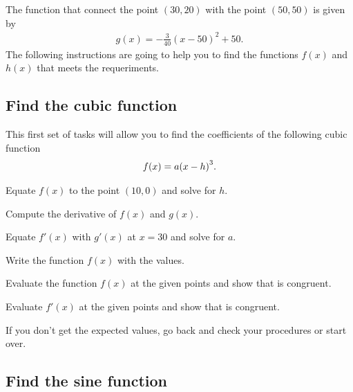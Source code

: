 \documentclass[11pt, a4paper, oneside]{article}
\begin{document}
    The function that connect the point \((30,20)\) with the point \((50,50)\) is given by
    \begin{gather*}
        g(x) = -\frac{3}{40}(x-50)^2 + 50.
    \end{gather*}
    The following instructions are going to help you to find the functions $f(x)$ and $h(x)$ that meets the requeriments.

    \subsection*{Find the cubic function}

    This first set of tasks will allow you to find the coefficients of the following cubic function
    \begin{gather*}
        f(x) = a\qty(x-h)^3.
    \end{gather*}

    Equate \(f(x)\) to the point \((10,0)\) and solve for \(h\).

    \boxarea[2cm]

    Compute the derivative of \(f(x)\) and \(g(x)\).
    
    \boxarea[2cm]

    Equate \(f'(x)\) with \(g'(x)\) at $x=30$ and solve for $a$.
    
    \boxarea[2cm]

    Write the function \(f(x)\) with the values.    
    
    \boxarea[2cm]

    Evaluate the function \(f(x)\) at the given points and show that is congruent.
    
    \boxarea[2cm]

    Evaluate \(f'(x)\) at the given points and show that is congruent.
    
    \boxarea[2cm]

    If you don't get the expected values, go back and check your procedures or start over.

    \subsection*{Find the sine function}
\end{document}
